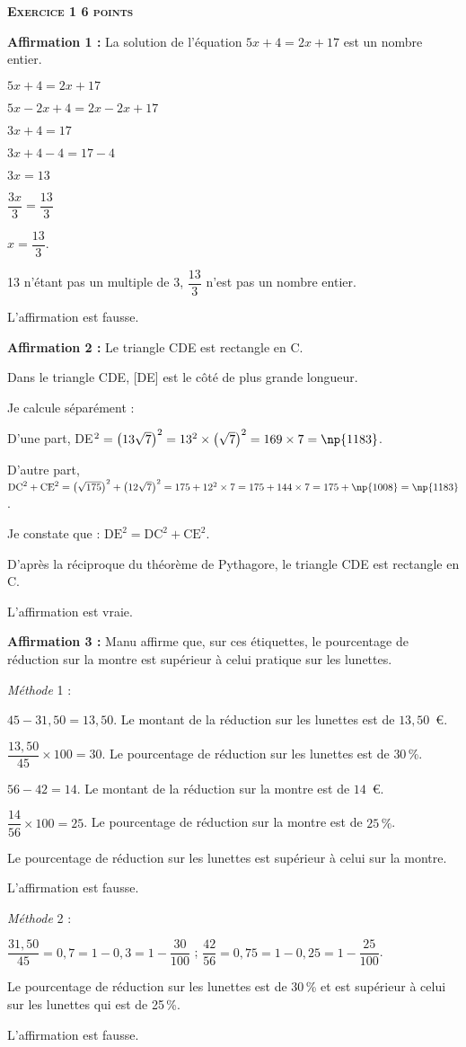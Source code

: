 \textbf{\textsc{Exercice 1 \hfill 6 points}}

\medskip
		
\textbf{Affirmation 1 :} La solution de l'équation $5x + 4 = 2x + 17$ est un nombre entier.

$5x + 4 = 2x + 17$
 
$5x - 2x + 4 = 2x -2x + 17$
 
$3x + 4 = 17$

$3x + 4 - 4 = 17 - 4$

$3x = 13$

$\dfrac{3x}{3}  = \dfrac{13}{3}$

$x = \dfrac{13}{3}$.

13 n'étant pas un multiple de 3, $\dfrac{13}{3}$ n'est pas un nombre entier.

L'affirmation est fausse.

\textbf{Affirmation 2 :} Le triangle CDE est rectangle en C.

Dans le triangle CDE, [DE] est le  côté de plus grande longueur.

Je calcule séparément : 

D'une part, DE$^2 = \left(13\sqrt{7}\right)^2 = 13^2 \times \left(\sqrt{7}\right)^2 = 169 \times  7 = \np{1183}$.

D'autre part, $\text{DC}^2 + \text{CE}^2 = \left(\sqrt{175}\right)^2 + \left(12\sqrt{7}\right)^2 = 175 + 12^2  \times 7 = 175  + 144 \times 7 = 175 + \np{1008} = \np{1183}$.

Je constate que : $\text{DE}^2 = \text{DC}^2 + \text{CE}^2$.

D'après la réciproque du théorème de Pythagore, le triangle CDE est rectangle en C.

L'affirmation est vraie.		

\textbf{Affirmation 3 :} Manu affirme que, sur ces étiquettes, le pourcentage de réduction sur la
montre est supérieur à celui pratique sur les lunettes.

\emph{Méthode }1 :

$45 - 31,50 = 13,50$. Le montant de la réduction sur les lunettes est de $13,50$~\euro.

$\dfrac{13,50}{45} \times 100 = 30$. Le pourcentage de réduction sur les lunettes est de $30$\,\%.

$56 - 42 =14$. Le montant de la réduction sur la montre est de $14$~\euro.

$\dfrac{14}{56} \times 100 = 25$. Le pourcentage de réduction sur la montre est de $25\,\%$.

Le pourcentage de réduction sur les lunettes est supérieur à celui sur la montre.

L'affirmation est fausse.

\emph{Méthode } 2 :

$\dfrac{31,50}{45} = 0,7 = 1 - 0,3 = 1 - \dfrac{30}{100}$ ; \quad $\dfrac{42}{56} = 0,75 = 1 - 0,25 = 1 - \dfrac{25}{100}$.

Le pourcentage de réduction sur les lunettes est de 30\,\% et est supérieur à celui sur les
lunettes qui est de 25\,\%.

L'affirmation est fausse.

\vspace{0,5cm}

